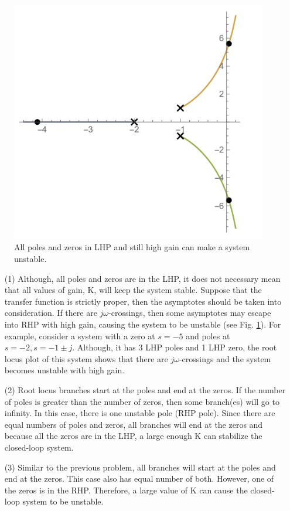 \documentclass[12pt]{article}
\begin{document}
\begin{figure}[h!]
    \centering
    \includegraphics[scale=0.5]{figs/7.2.png}
    \caption{All poles and zeros in LHP and still high gain can make a system unstable.}
    \label{fig:prb_6}
\end{figure}
\begin{itemize}
    \item [(1)] Although, all poles and zeros are in the LHP, it does not necessary mean that all values of gain, K, will keep the system stable. Suppose that the transfer function is strictly proper, then the asymptotes should be taken into consideration. If there are $j \omega$-crossings, then some asymptotes may escape into RHP with high gain, causing the system to be unstable (see Fig. \ref{fig:prb_6}). For example, consider a system with a zero at $s =-5$ and poles at $s =-2, s =-1 \pm j$. Although, it has 3 LHP poles and 1 LHP zero, the root locus plot of this system shows that there are $j \omega$-crossings and the system becomes unstable with high gain.
    \item[(2)]  Root locus branches start at the poles and end at the zeros. If the number of poles is greater than the number of zeros, then some branch(es) will go to infinity. In this case, there is one unstable pole (RHP pole). Since there are equal numbers of poles and zeros, all branches will end at the zeros and because all the zeros are in the LHP, a large enough K can stabilize the closed-loop system.
    \item[(3)] Similar to the previous problem, all branches will start at the poles and end at the zeros. This case also has equal number of both. However, one of the zeros is in the RHP. Therefore, a large value of K can cause the closed-loop system to be unstable. 
\end{itemize}
\clearpage
\end{document}
